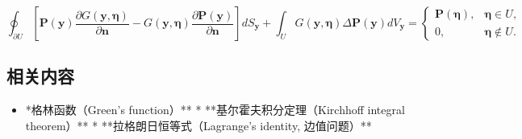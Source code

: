 $$
\oint_{\partial U} 
\left[
\mathbf{P}(\mathbf{y}) \frac{\partial G(\mathbf{y}, \boldsymbol{\eta})}{\partial \mathbf{n}}
- G(\mathbf{y}, \boldsymbol{\eta}) \frac{\partial \mathbf{P}(\mathbf{y})}{\partial \mathbf{n}}
\right] dS_{\mathbf{y}}
+ \int_U G(\mathbf{y}, \boldsymbol{\eta}) \Delta \mathbf{P}(\mathbf{y}) dV_{\mathbf{y}}
=
\begin{cases}
\mathbf{P}(\boldsymbol{\eta}), & \boldsymbol{\eta} \in U,\\
0, & \boldsymbol{\eta} \notin U.
\end{cases}~
$$
\subsection{相关内容}

\begin{itemize}
\item *格林函数（Green's function）**
* **基尔霍夫积分定理（Kirchhoff integral theorem）**
* **拉格朗日恒等式（Lagrange's identity, 边值问题）**

\end{itemize}
